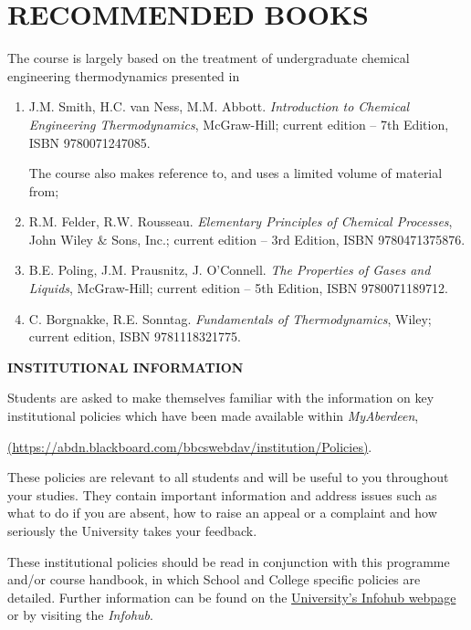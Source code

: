 \documentclass[12pts,a4paper,amsmath,amssymb,floatfix]{article}%
\begin{document}
\section{RECOMMENDED BOOKS}
The course is largely based on the treatment of undergraduate chemical engineering thermodynamics presented in
\begin{enumerate}[1.]
\item J.M. Smith, H.C. van Ness, M.M. Abbott. {\it Introduction to Chemical Engineering Thermodynamics}, McGraw-Hill; current edition – 7th Edition, ISBN 9780071247085.
\medskip

The course also makes reference to, and uses a limited volume of material from;
\medskip

\item R.M. Felder, R.W. Rousseau. {\it Elementary Principles of Chemical Processes}, John Wiley $\&$ Sons, Inc.; current edition – 3rd Edition, ISBN 9780471375876.
\item B.E. Poling, J.M. Prausnitz, J. O’Connell. {\it The Properties of Gases and Liquids}, McGraw-Hill; current edition – 5th Edition, ISBN 9780071189712.
\item C. Borgnakke, R.E. Sonntag. {\it Fundamentals of Thermodynamics}, Wiley; current edition, ISBN 9781118321775.
\end{enumerate}


\bigskip

{\large {\bf INSTITUTIONAL INFORMATION}}

Students are asked to make themselves familiar with the information on key institutional policies which have been made available within {\it MyAberdeen},
\begin{center}
\href{https://abdn.blackboard.com/bbcswebdav/institution/Policies}{(https://abdn.blackboard.com/bbcswebdav/institution/Policies)}.
\end{center}
These policies are relevant to all students and will be useful to you throughout your studies. They contain important information and address issues such as what to do if you are absent, how to raise an appeal or a complaint and how seriously the University takes your feedback. 
\medskip

These institutional policies should be read in conjunction with this programme and/or course handbook, in which School and College specific policies are detailed. Further information can be found on the \href{http:www.abdn.ac.uk/infohub/}{University's Infohub webpage} or by visiting the {\it Infohub}.
\end{document}
